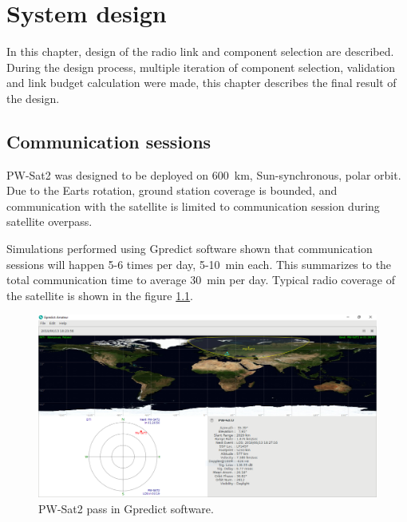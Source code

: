 \chapter{System design}

In this chapter, design of the radio link and component selection are described. During the design process, multiple iteration of component selection, validation and link budget calculation were made, this chapter describes the final result of the design.

\section{Communication sessions}
PW-Sat2 was designed to be deployed on \SI{600}{\kilo\meter}, Sun-synchronous, polar orbit. Due to the Earts rotation, ground station coverage is bounded, and communication with the satellite is limited to communication session during satellite overpass.

Simulations performed using Gpredict software \cite{gpredict_website} shown that communication sessions will happen \si{5}-\si{6} times per day, \si{5}-\SI{10}{\minute} each. This summarizes to the total communication time to average \SI{30}{\minute} per day. Typical radio coverage of the satellite is shown in the figure \ref{gpredict_pass}.

\begin{figure}[H]
    \centering
    \includegraphics[width=0.8\paperwidth]{img/3/gpredict_pass.png}
    \caption{PW-Sat2 pass in Gpredict software.}
    \label{gpredict_pass}
\end{figure}


